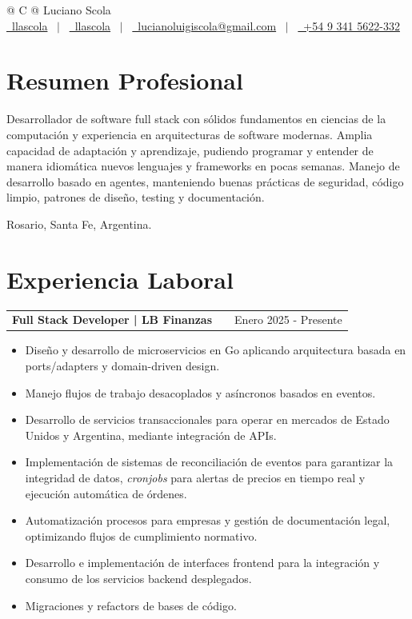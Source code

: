 \documentclass[a4paper,12pt]{article}
\makeatletter
\newenvironment{joblong}[2]
    {
    \begin{tabularx}{\linewidth}{@{}l X r@{}}
    \textbf{#1} & \hfill & #2 \\[3.75pt]
    \end{tabularx}
    \begin{itemize}[nosep, after=\strut, leftmargin=1em, itemsep=3pt, label=--]
    }
    {
    \end{itemize}
    }
\makeatother
\begin{document}
\pagestyle{empty}

\begin{tabularx}{\linewidth}{@{} C @{}}
{\Huge Luciano Scola} \\[7.5pt]
\href{https://github.com/llascola}{\raisebox{-0.05\height}{\faGithub}\ llascola} \ $|$ \
\href{https://linkedin.com/in/llascola}{\raisebox{-0.05\height}{\faLinkedin}\ llascola} \ $|$ \
\href{mailto:lucianoluigiscola@gmail.com}{\raisebox{-0.05\height}{\faEnvelope}\ lucianoluigiscola@gmail.com} \ $|$ \
\href{tel:+5493415622332}{\raisebox{-0.05\height}{\faMobile}\ +54 9 341 5622-332} \\
\end{tabularx}

\section{Resumen Profesional}
Desarrollador de software full stack con sólidos fundamentos en ciencias de la
computación y experiencia en arquitecturas de software modernas. Amplia capacidad
de adaptación y aprendizaje, pudiendo programar y entender de manera idiomática
nuevos lenguajes y frameworks en pocas semanas. Manejo de desarrollo basado en agentes,
manteniendo buenas prácticas de seguridad, código limpio, patrones de diseño, testing y
documentación.

Rosario, Santa Fe, Argentina.

\section{Experiencia Laboral}

\begin{joblong}{Full Stack Developer | LB Finanzas}{Enero 2025 - Presente}
\item Diseño y desarrollo de microservicios en Go aplicando arquitectura basada en ports/adapters y domain-driven design.
\item Manejo flujos de trabajo desacoplados y asíncronos basados en eventos.
\item Desarrollo de servicios transaccionales para operar en mercados de Estado Unidos y Argentina, mediante integración de APIs.
\item Implementación de sistemas de reconciliación de eventos para garantizar la integridad de datos, \textit{cronjobs} para alertas de precios en tiempo real y ejecución automática de órdenes.
\item Automatización procesos para empresas y gestión de documentación legal, optimizando flujos de cumplimiento normativo.
\item Desarrollo e implementación de interfaces frontend para la integración y consumo de los servicios backend desplegados.
\item Migraciones y refactors de bases de código.
\end{joblong}
\end{document}
